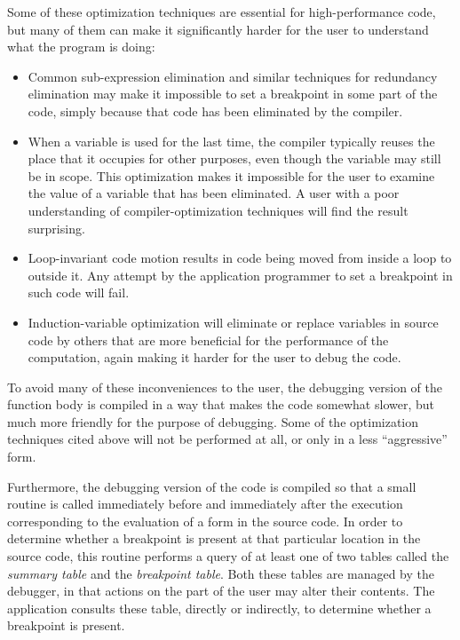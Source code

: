 Some of these optimization techniques are essential for
high-performance code, but many of them can make it significantly
harder for the user to understand what the program is doing:

\begin{itemize}
\item Common sub-expression elimination and similar techniques for
  redundancy elimination may make it impossible to set
  a breakpoint in some part of the code, simply because that code has
  been eliminated by the compiler.
\item When a variable is used for the last time, the compiler
  typically reuses the place that it occupies for other purposes, even
  though the variable may still be in scope.  This optimization makes
  it impossible for the user to examine the value of
  a variable that has been eliminated.  A user with
  a poor understanding of compiler-optimization techniques will find
  the result surprising.
\item Loop-invariant code motion results in code being moved from
  inside a loop to outside it.  Any attempt by the application
  programmer to set a breakpoint in such code will fail.
\item Induction-variable optimization will eliminate or replace
  variables in source code by others that are more beneficial for
  the performance of the computation, again making it harder for the
  user to debug the code.
\end{itemize}

To avoid many of these inconveniences to the user,
the debugging version of the function body is compiled in a way that
makes the code somewhat slower, but much more friendly for the purpose
of debugging.  Some of the optimization techniques cited above will
not be performed at all, or only in a less ``aggressive'' form.

Furthermore, the debugging version of the code is compiled so that a
small routine is called immediately before and immediately after the
execution corresponding to the evaluation of a form in the source
code.  In order to determine whether a breakpoint is present at that
particular location in the source code, this routine performs a query
of at least one of two tables called the \emph{summary table} and the
\emph{breakpoint table}.  Both these tables are managed by the
debugger, in that actions on the part of the user may alter their
contents.  The application consults these table, directly or
indirectly, to determine whether a breakpoint is present.

